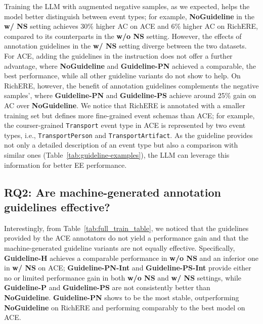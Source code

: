 Training the LLM with augmented negative samples, as we expected, helps the model better distinguish between event types; for example, \textbf{NoGuideline} in the \textbf{w/ NS} setting achieves 30\% higher AC on ACE and 6\% higher AC on RichERE, compared to its counterparts in the \textbf{w/o NS} setting. 
However, the effects of annotation guidelines in the \textbf{w/ NS} setting diverge between the two datasets. For {ACE}, adding the guidelines in the instruction does not offer a further advantage, where \textbf{NoGuideline} and \textbf{Guideline-PN} achieved a comparable, the best performance, while all other guideline variants do not show to help. On RichERE, however, the benefit of annotation guidelines complements the negative samples', where \textbf{Guideline-PN} and \textbf{Guideline-PS} achieve around 25\% gain on AC over \textbf{NoGuideline}. We notice that RichERE is annotated with a smaller training set but defines more fine-grained event schemas than ACE; for example, the courser-grained \texttt{Transport} event type in ACE is represented by two event types, i.e., \texttt{TransportPerson} and \texttt{TransportArtifact}. As the guideline provides not only a detailed description of an event type but also a comparison with similar ones (Table~\ref{tab:guideline-examples}), the LLM can leverage this information for better EE performance.



\subsection{RQ2: Are machine-generated annotation guidelines effective?}
Interestingly, from Table~\ref{tab:full_train_table}, we noticed that the guidelines provided by the ACE annotators do not yield a performance gain and that the machine-generated guideline variants are not equally effective. Specifically, \textbf{Guideline-H} achieves a comparable performance in \textbf{w/o NS} and an inferior one in \textbf{w/ NS} on ACE; \textbf{Guideline-PN-Int} and \textbf{Guideline-PS-Int} provide either no or limited performance gain in both \textbf{w/o NS} and \textbf{w/ NS} settings, while \textbf{Guideline-P} and \textbf{Guideline-PS} are not consistently better than \textbf{NoGuideline}. \textbf{Guideline-PN} shows to be the most stable, outperforming \textbf{NoGuideline} on RichERE and performing comparably to the best model on ACE.

